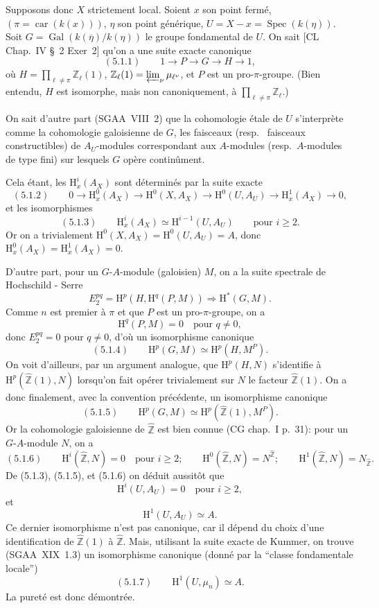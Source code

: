 \documentclass[11pt]{article}
\renewcommand{\H}{\mathrm{H}}
\DeclareMathOperator{\Spec}{Spec}
\newcommand{\Z}{\mathbb{Z}}
\newcommand{\car}{\operatorname{car}}
\newcommand{\ol}[1]{\overline{#1}}
\providecommand{\Gal}{\operatorname{Gal}}
\providecommand{\car}{\operatorname{car}}
\providecommand{\car}{\operatorname{car}}
\providecommand{\Z}{\mathbb Z}
\providecommand{\Spec}{\operatorname{Spec}}
\providecommand{\Spec}{\operatorname{Spec}}
\providecommand{\Spec}{\operatorname{Spec}}
\providecommand{\car}{\operatorname{car}}
\providecommand{\Spec}{\operatorname{Spec}}
\providecommand{\Gal}{\operatorname{Gal}}
\begin{document}
Supposons donc $X$ strictement local. Soient $x$ son point fermé, $(\pi=\car(k(x)))$, $\eta$ son point générique, $U=X-x=\Spec(k(\eta))$. Soit $G=\Gal(k(\ol{\eta})/k(\eta))$ le groupe fondamental de $U$. On sait [CL Chap.~IV \S~2 Exer~2] qu'on a une suite exacte canonique
\[
(5.1.1)\qquad 1\longrightarrow P\longrightarrow G\longrightarrow H\longrightarrow1,
\]
où $H=\prod_{\ell\ne\pi}\Z_\ell(1)$, $\Z_\ell(1)=\varprojlim_{\nu} \mu_{\ell^\nu}$, et $P$ est un pro-$\pi$-groupe. (Bien entendu, $H$ est isomorphe, mais non canoniquement, à $\prod_{\ell\ne\pi}\Z_\ell$.)

On sait d'autre part (SGAA~VIII~2) que la cohomologie étale de $U$ s'interprète comme la cohomologie galoisienne de $G$, les faisceaux (resp.~
faisceaux constructibles) de $A_U$-modules correspondant aux $A$-modules (resp.~$A$-modules de type fini) sur lesquels $G$ opère continûment.

Cela étant, les $\H_x^i(A_X)$ sont déterminés par la suite exacte
\[
(5.1.2)\qquad 0\longrightarrow \H_x^0(A_X)\longrightarrow \H^0(X,A_X)\longrightarrow \H^0(U,A_U)\longrightarrow \H_x^1(A_X)\longrightarrow0,
\]
et les isomorphismes
\[
(5.1.3)\qquad \H_x^i(A_X)\simeq \H^{i-1}(U,A_U)\qquad\text{pour }i\geqslant2.
\]
Or on a trivialement $\H^0(X,A_X)=\H^0(U,A_U)=A$, donc $\H_x^0(A_X)=\H_x^1(A_X)=0$.

D'autre part, pour un $G$-$A$-module (galoisien) $M$, on a la suite spectrale de Hochschild - Serre
\[
E_2^{pq}=\H^p(H,\H^q(P,M))\Longrightarrow \H^{*}(G,M).
\]
Comme $n$ est premier à $\pi$ et que $P$ est un pro-$\pi$-groupe, on a
\[
\H^q(P,M)=0\quad\text{pour }q\ne0,
\]
donc $E_2^{pq}=0$ pour $q\ne0$, d'où un isomorphisme canonique
\[
(5.1.4)\qquad \H^p(G,M)\simeq \H^p(H,M^P).
\]
On voit d'ailleurs, par un argument analogue, que $\H^p(H,N)$ s'identifie à $\H^p(\widehat{\Z}(1),N)$ lorsqu'on fait opérer trivialement sur $N$ le facteur $\widehat{\Z}(1)$. On a donc finalement, avec la convention précédente, un isomorphisme canonique
\[
(5.1.5)\qquad \H^p(G,M)\simeq \H^p(\widehat{\Z}(1),M^P).
\]
Or la cohomologie galoisienne de $\widehat{\Z}$ est bien connue (CG chap.~I p.~31): pour un $G$-$A$-module $N$, on a
\[
(5.1.6)\qquad
\H^i(\widehat{\Z},N)=0\quad\text{pour }i\geqslant2;
\qquad
\H^0(\widehat{\Z},N)=N^{\widehat{\Z}};
\qquad
\H^1(\widehat{\Z},N)=N_{\widehat{\Z}}.
\]
De (5.1.3), (5.1.5), et (5.1.6) on déduit aussitôt que
\[
\H^i(U,A_U)=0\quad\text{pour }i\geqslant2,
\]
et
\[
\H^1(U,A_U)\simeq A.
\]
Ce dernier
isomorphisme n'est pas canonique, car il dépend du choix d'une identification de $\widehat{\Z}(1)$ à $\widehat{\Z}$. Mais, utilisant la suite exacte de Kummer, on trouve (SGAA~XIX~1.3) un isomorphisme canonique (donné par la ``classe fondamentale locale'')
\[
(5.1.7)\qquad \H^1(U,\mu_n)\simeq A.
\]
La pureté est donc démontrée.
\end{document}
